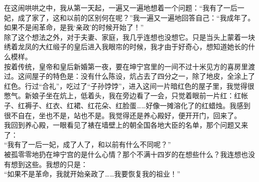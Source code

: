 在这闹哄哄之中，我从第一天起，一遍又一遍地想着一个问题：“我有了一后一妃，成了家了，这和以前的区别何在呢？”我一遍又一遍地回答自己：“我成年了。如果不是闹革命，是我‘亲政’的时候开始了！”\\

除了这个想法之外，对于夫妻、家庭，我几乎连想也没想它。只是当头上蒙着一块绣着龙凤的大红缎子的皇后进入我眼帘的时候，我才由于好奇心，想知道她长的什么模样。\\

按着传统，皇帝和皇后新婚第一夜，要在坤宁宫里的一间不过十米见方的喜房里渡过。这间屋子的特色是：没有什么陈设，炕占去了四分之一，除了地皮，全涂上了红色。行过“合礼”，吃过了“子孙饽饽”，进入这间一片暗红色的屋子里，我觉得很憋气。新娘子坐在炕上，低着头，我在旁边看了一会，只觉着眼前一片红：红帐子、红褥子、红衣、红裙、红花朵、红脸蛋……好像一摊溶化了的红蜡烛。我感到很不自在，坐也不是，站也不是。我觉得还是养心殿好，便开开门，回来了。\\

我回到养心殿，一眼看见了裱在墙壁上的朝全国各地大臣的名单，那个问题又来了：\\

“我有了一后一妃，成了人了，和以前有什么不同呢？”\\

被孤零零地扔在坤宁宫的是什么心情？那个不满十四岁的在想些什么？我连想也没有想到这些。我想的只是：\\

“如果不是革命，我就开始亲政了……我要恢复我的祖业！”
